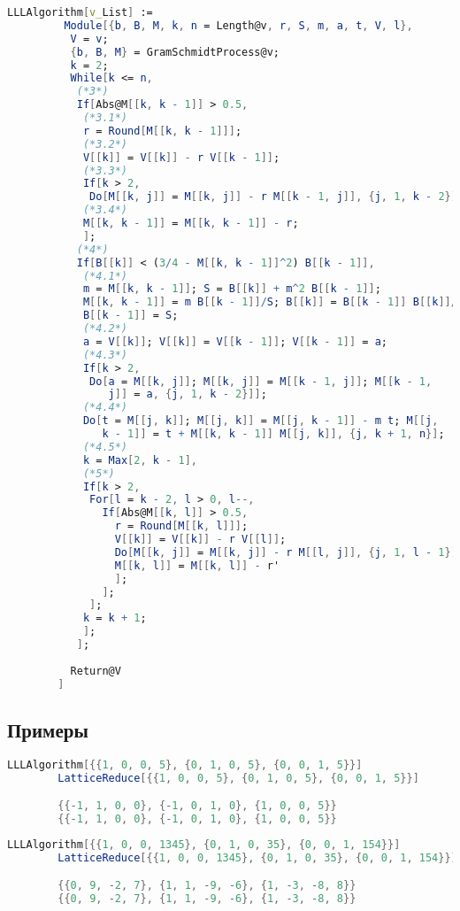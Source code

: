     	\begin{lstlisting}[language=Mathematica,caption={
      		LLL-алгоритм	
    	}]
		LLLAlgorithm[v_List] := 
		 Module[{b, B, M, k, n = Length@v, r, S, m, a, t, V, l},
		  V = v;
		  {b, B, M} = GramSchmidtProcess@v;
		  k = 2;
		  While[k <= n,
		   (*3*)
		   If[Abs@M[[k, k - 1]] > 0.5,
		    (*3.1*)
		    r = Round[M[[k, k - 1]]];
		    (*3.2*)
		    V[[k]] = V[[k]] - r V[[k - 1]];
		    (*3.3*)
		    If[k > 2, 
		     Do[M[[k, j]] = M[[k, j]] - r M[[k - 1, j]], {j, 1, k - 2}]];
		    (*3.4*)
		    M[[k, k - 1]] = M[[k, k - 1]] - r;
		    ];
		   (*4*)
		   If[B[[k]] < (3/4 - M[[k, k - 1]]^2) B[[k - 1]],
		    (*4.1*)
		    m = M[[k, k - 1]]; S = B[[k]] + m^2 B[[k - 1]];
		    M[[k, k - 1]] = m B[[k - 1]]/S; B[[k]] = B[[k - 1]] B[[k]]/S; 
		    B[[k - 1]] = S;
		    (*4.2*)
		    a = V[[k]]; V[[k]] = V[[k - 1]]; V[[k - 1]] = a;
		    (*4.3*)
		    If[k > 2, 
		     Do[a = M[[k, j]]; M[[k, j]] = M[[k - 1, j]]; M[[k - 1, 
		        j]] = a, {j, 1, k - 2}]];
		    (*4.4*)
		    Do[t = M[[j, k]]; M[[j, k]] = M[[j, k - 1]] - m t; M[[j, 
		       k - 1]] = t + M[[k, k - 1]] M[[j, k]], {j, k + 1, n}];
		    (*4.5*)
		    k = Max[2, k - 1],
		    (*5*)
		    If[k > 2,
		     For[l = k - 2, l > 0, l--,
		       If[Abs@M[[k, l]] > 0.5,
		         r = Round[M[[k, l]]];
		         V[[k]] = V[[k]] - r V[[l]];
		         Do[M[[k, j]] = M[[k, j]] - r M[[l, j]], {j, 1, l - 1}];
		         M[[k, l]] = M[[k, l]] - r'
		         ];
		       ];
		     ];
		    k = k + 1;
		    ];
		   ];
		  
	  	  Return@V
  		]
    	\end{lstlisting}

    	\subsection{Примеры}

    	\begin{lstlisting}[language=Mathematica,caption={
      		Пример	1
    	}]
		LLLAlgorithm[{{1, 0, 0, 5}, {0, 1, 0, 5}, {0, 0, 1, 5}}]
		LatticeReduce[{{1, 0, 0, 5}, {0, 1, 0, 5}, {0, 0, 1, 5}}]

		{{-1, 1, 0, 0}, {-1, 0, 1, 0}, {1, 0, 0, 5}}
		{{-1, 1, 0, 0}, {-1, 0, 1, 0}, {1, 0, 0, 5}}
    	\end{lstlisting}

    	\begin{lstlisting}[language=Mathematica,caption={
      		Пример	2
    	}]
		LLLAlgorithm[{{1, 0, 0, 1345}, {0, 1, 0, 35}, {0, 0, 1, 154}}]
		LatticeReduce[{{1, 0, 0, 1345}, {0, 1, 0, 35}, {0, 0, 1, 154}}]

		{{0, 9, -2, 7}, {1, 1, -9, -6}, {1, -3, -8, 8}}
		{{0, 9, -2, 7}, {1, 1, -9, -6}, {1, -3, -8, 8}}
    	\end{lstlisting}

